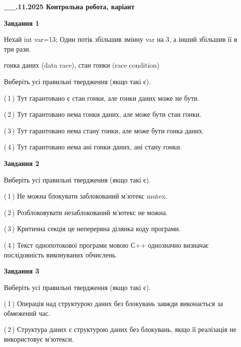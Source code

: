 \documentclass[12pt, ukrainian]{article}
\begin{document}
\begin {large}

\textbf{\_\_.11.2025 Контрольна робота, варіант  }\par


{

\begin{center}
\textbf{Завдання 1}
\end{center}
Нехай int var=13; Один потік збільшив змінну var на 3, а інший збільшив її в три рази.

гонка даних (data race), стан гонки (race condition)

Виберіть усі правильні твердження (якщо такі є).\par
\vspace{2mm}
(\,1\,) Тут гарантовано є стан гонки, але гонки даних може не бути.%

(\,2\,) Тут гарантовано нема гонки даних, але може бути стан гонки.%

(\,3\,) Тут гарантовано нема стану гонки, але може бути гонка даних.%

(\,4\,) Тут гарантовано нема ані гонки даних, ані стану гонки.%



\begin{center}
\textbf{Завдання 2}
\end{center}
Виберіть усі правильні твердження (якщо такі є).\par
\vspace{2mm}

(\,1\,) Не можна блокувати заблокований м’ютекс mutex.%

(\,2\,) Розблоковувати незаблокований м’ютекс не можна.%

(\,3\,) Критична секція це неперервна ділянка коду програми.%

(\,4\,) Текст однопотокової програми мовою С++ однозначно визначає послідовність виконуваних обчислень.%



\begin{center}
\textbf{Завдання 3}
\end{center}
Виберіть усі правильні твердження (якщо такі є).\par
\vspace{2mm}

(\,1\,) Операція над структурою даних без блокувань завжди виконається за обмежений час.%

(\,2\,) Структура даних є структурою даних без блокувань, якщо її реалізація не використовує м’ютекси.%

}
\end{large}
\end{document}
